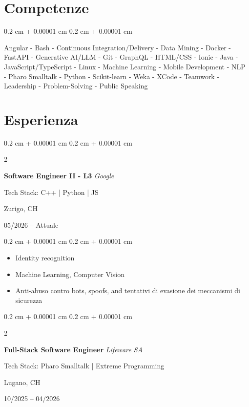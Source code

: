 \documentclass[10pt, letterpaper]{article}
\newenvironment{highlights}{
    \begin{itemize}[
        topsep=0.10 cm,
        parsep=0.10 cm,
        partopsep=0pt,
        itemsep=0pt,
        leftmargin=0.4 cm + 10pt
    ]
}{
    \end{itemize}
} %
\newenvironment{onecolentry}{
    \begin{adjustwidth}{
        0.2 cm + 0.00001 cm
    }{
        0.2 cm + 0.00001 cm
    }
}{
    \end{adjustwidth}
} %
\newenvironment{twocolentry}[2][]{
    \onecolentry
    \def\secondColumn{#2}
    \setcolumnwidth{\fill, 4.5 cm}
    \begin{paracol}{2}
}{
    \switchcolumn \raggedleft \secondColumn
    \end{paracol}
    \endonecolentry
} %
\begin{document}
    
    \section{Competenze}

        \begin{onecolentry}
            Angular - Bash - Continuous Integration/Delivery - Data Mining - Docker - FastAPI - Generative AI/LLM - Git - GraphQL - HTML/CSS - Ionic - Java - JavaScript/TypeScript - Linux - Machine Learning - Mobile Development - NLP - Pharo Smalltalk - Python - Scikit-learn - Weka - XCode - Teamwork - Leadership - Problem-Solving - Public Speaking
        \end{onecolentry}

     
    \section{Esperienza}
        \begin{twocolentry}{
        Zurigo, CH
        
        05/2026 – Attuale}
            \textbf{Software Engineer II - L3} \textit{Google}

            {\footnotesize Tech Stack: C++ | Python | JS}
        \end{twocolentry}

        \vspace{0.10 cm}
                \begin{onecolentry}
            \begin{highlights}
                \item Identity recognition
                \item Machine Learning, Computer Vision
                \item Anti-abuso contro bots, spoofs, and tentativi di evasione dei meccanismi di sicurezza
            \end{highlights}
        \end{onecolentry}
        \vspace{0.2 cm}

        \begin{twocolentry}{
        Lugano, CH
        
        10/2025 – 04/2026}
            \textbf{Full-Stack Software Engineer} \textit{Lifeware SA}

            {\footnotesize Tech Stack: Pharo Smalltalk | Extreme Programming}
        \end{twocolentry}
\end{document}
